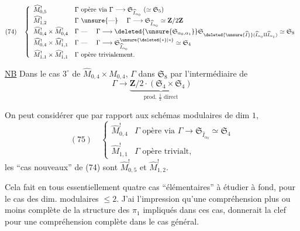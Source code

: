\[
(74)\quad\left\{\begin{array}{ll}
\widehat M^!_{0,5}&\Gamma\text{ opère via }\Gamma\longrightarrow\mathfrak S_{\widehat I_{\alpha_0}}\ (\simeq\mathfrak S_5)\\
\widehat M^!_{1,2}&\Gamma\text{ \unsure{---} }\quad\Gamma\longrightarrow\mathfrak S_{\widehat I_{\alpha_0}}\simeq\mathbf Z/2\mathbf Z\\
\widehat M^!_{0,4}\times\widehat M^!_{0,4}&\Gamma\text{ --- }\quad\Gamma\longrightarrow\deleted{\unsure{\mathfrak S_{\alpha_0,\alpha_1}}}\mathfrak S_{\deleted{\unsure{\widehat I}}(\widehat I_{\alpha_0}\amalg\widehat I_{\alpha_1})}\simeq\mathfrak S_8\\
\widehat M^!_{0,4}\times\widehat M^!_{1,1}&\Gamma\text{ --- }\quad\Gamma\longrightarrow\mathfrak S^{\unsure{\deleted{*}|*}}_{\widehat I_{\alpha_0}}\simeq\mathfrak S_4\\
\widehat M^!_{1,1}\times\widehat M^!_{1,1}&\Gamma\text{ opère trivialement.}
\end{array}\right.
\]

\uline{NB}  Dans le cas $3^\circ$ de $\widehat M_{0,4}\times\widehat M_{0,4}$, $\Gamma$  dans $\mathfrak S_8$ par l'intermédiaire de
\[
\Gamma\longrightarrow\underbrace{\mathbf Z/2\mathbin{\cdot}(\mathfrak S_4\times\mathfrak S_4)}_{\text{prod. }\frac12\text{ direct}}
\]

On peut considérer que par rapport aux schémas modulaires  de dim $1$, 
\[
(75)\quad\left\{\begin{array}{ll}
\widehat M^!_{0,4}&\Gamma\text{ opère via }\Gamma\longrightarrow\mathfrak S_{\widehat I_{\alpha_0}}\simeq\mathfrak S_4\\
\widehat M^!_{1,1}&\Gamma\text{ opère trivialt},
\end{array}\right.
\]
les ``cas nouveaux'' de (74) sont $\widehat M^!_{0,5}$ et $\widehat M^!_{1,2}$.

Cela fait en tous essentiellement quatre cas ``élémentaires'' à étudier à fond, pour le cas des dim. modulaires $\leq2$. J'ai l'impression qu'une compréhension plus ou moins complète de la structure des $\pi_1$  impliqués dans ces cas, donnerait la clef pour une compréhension complète dans le cas général.
